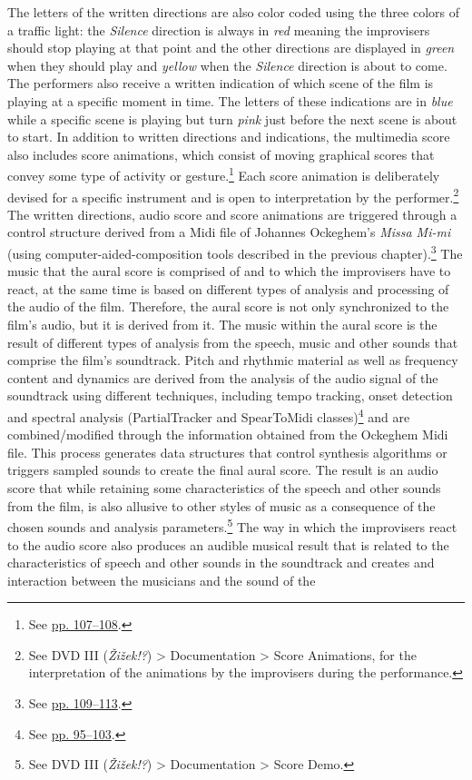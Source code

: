 The letters of the written directions are also color coded using the three colors of a traffic light: the \emph{Silence} direction is always in \emph{red} meaning the improvisers should stop playing at that point and the other directions are displayed in \emph{green} when they should play and \emph{yellow} when the \emph{Silence} direction is about to come. The performers also receive a written indication of which scene of the film is playing at a specific moment in time. The letters of these indications are in \emph{blue} while a specific scene is playing but turn \emph{pink} just before the next scene is about to start. In addition to written directions and indications, the multimedia score also includes score animations, which consist of moving graphical scores that convey some type of activity or gesture.\footnote{See \hyperlink{algoanimation}{pp. 107--108}.} Each score animation is deliberately devised for a specific instrument and is open to interpretation by the performer.\footnote{See DVD III (\emph{\v{Z}i\v{z}ek!?}) \tiny \textgreater \footnotesize \hspace{0pt} Documentation \tiny \textgreater \footnotesize \hspace{0pt} Score Animations, for the interpretation of the animations by the improvisers during the performance.} The written directions, audio score and score animations are triggered through a control structure derived from a Midi file of Johannes Ockeghem's \emph{Missa Mi-mi} (using computer-aided-composition tools described in the previous chapter).\footnote{See \hyperlink{compueraided}{pp. 109--113}.} The music that the aural score is comprised of and to which the improvisers have to react, at the same time is based on different types of analysis and processing of the audio of the film. Therefore, the aural score is not only synchronized to the film's audio, but it is derived from it. The music within the aural score is the result of different types of analysis from the speech, music and other sounds that comprise the film's soundtrack. Pitch and rhythmic material as well as frequency content and dynamics are derived from the analysis of the audio signal of the soundtrack using different techniques, including tempo tracking, onset detection and spectral analysis (PartialTracker and SpearToMidi classes)\footnote{See \hyperlink{spectrack}{pp. 95--103}.} and are combined/modified through the information obtained from the Ockeghem Midi file. This process generates data structures that control synthesis algorithms or triggers sampled sounds to create the final aural score. The result is an audio score that while retaining some characteristics of the speech and other sounds from the film, is also allusive to other styles of music as a consequence of the chosen sounds and analysis parameters.\footnote{See DVD III (\emph{\v{Z}i\v{z}ek!?}) \tiny \textgreater \footnotesize \hspace{0pt} Documentation \tiny \textgreater \footnotesize \hspace{0pt} Score Demo.} The way in which the improvisers react to the audio score also produces an audible musical result that is related to the characteristics of speech and other sounds in the soundtrack and creates and interaction between the musicians and the sound of the 